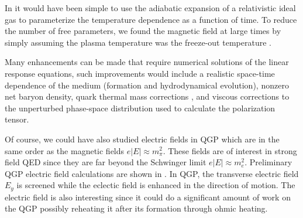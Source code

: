 In \cite{Grayson:2022asf} it would have been simple to use the adiabatic expansion of a relativistic ideal gas \cite{Bjorken:1982qr} to parameterize the temperature dependence as a function of time. To reduce the number of free parameters, we found the magnetic field at large times by simply assuming the plasma temperature was the freeze-out temperature .

Many enhancements can be made that require numerical solutions of the linear response equations, such improvements would include a realistic space-time dependence of the medium (formation and hydrodynamical evolution), nonzero net baryon density, quark thermal mass corrections \cite{Weldon:1982bn}, and viscous corrections to the unperturbed phase-space distribution used to calculate the polarization tensor.

Of course, we could have also studied electric fields in QGP which are in the same order as the magnetic fields $e|E| \approx m_\pi^2$. These fields are of interest in strong field QED since they are far beyond the Schwinger limit $e|E| \approx m_e^2$. Preliminary QGP electric field calculations are shown in . In QGP, the transverse electric field $E_y$ is screened while the eclectic field is enhanced in the direction of motion. The electric field is also interesting since it could do a significant amount of work on the QGP possibly reheating it after its formation through ohmic heating. 

